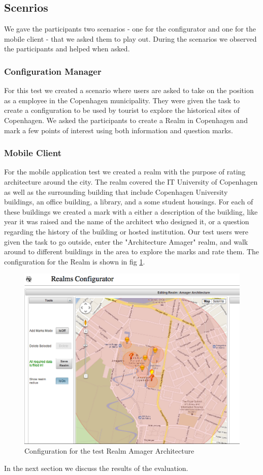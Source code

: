 \subsection{Scenrios} %
\label{sub:scenrios}
We gave the participants two scenarios - one for the configurator and one for the mobile client - that we asked them to play out. During the scenarios we observed the participants and helped when asked.

\subsubsection{Configuration Manager} %
\label{sub:configuration_manager_evaluation}
For this test we created a scenario where users are asked to take on the position as a employee in the Copenhagen municipality. They were given the task to create a configuration to be used by tourist to explore the historical sites of Copenhagen. We asked the participants to create a Realm in Copenhagen and mark a few points of interest using both information and question marks.


\subsubsection{Mobile Client} %
\label{sub:android_application_evaluation}
For the mobile application test we created a realm with the purpose of rating architecture around the city. The realm covered the IT University of Copenhagen as well as the surrounding building that include Copenhagen University buildings, an office building, a library, and a some student housings. For each of these buildings we created a mark with a either a description of the building, like year it was raised and the name of the architect who designed it, or a question regarding the history of the building or hosted institution. Our test users were given the task to go outside, enter the "Architecture Amager" realm, and walk around to different buildings in the area to explore the marks and rate them. The configuration for the Realm is shown in fig \ref{fig.amager.arc}.

\begin{figure}
	\centering
	\includegraphics[width=0.7\linewidth]{fig/amager_configuration}
	\caption{Configuration for the test Realm Amager Architecture}
	\label{fig.amager.arc}
\end{figure}

In the next section we discuss the results of the evaluation.

